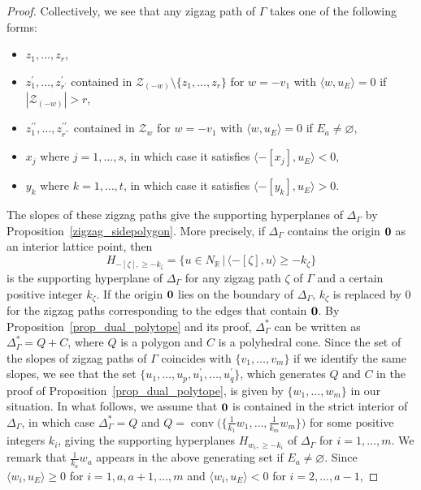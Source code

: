 \documentclass[pdftex]{sigma}%
\numberwithin{equation}{section}
\numberwithin{figure}{section}
\numberwithin{table}{section}
\newcommand{\RR}{\mathbb{R}}
\newcommand{\calZ}{\mathcal{Z}}
\begin{document}
\begin{proof}
Collectively, we see that any zigzag path of $\Gamma$ takes one of the following forms:
\begin{itemize}\itemsep=0pt
\item $z_1,\dots,z_r$,
\item $z_1^\prime,\dots,z_{r^\prime}^\prime$ contained in $\calZ_{(-w)}{\setminus}\{z_1,\dots,z_r\}$ for $w=-v_1$ with $\langle w,u_E\rangle=0$ if $|\calZ_{(-w)}|>r$,
\item $z_1^{\prime\prime},\dots,z_{r^{\prime\prime}}^{\prime\prime}$ contained in $\calZ_w$ for $w=-v_1$ with $\langle w,u_E\rangle=0$ if $E_a\neq\varnothing$,
\item $x_j$ where $j=1,\dots,s$, in which case it satisfies $\langle-[x_j],u_E\rangle<0$,
\item $y_k$ where $k=1,\dots,t$, in which case it satisfies $\langle-[y_k],u_E\rangle>0$.
\end{itemize}
The slopes of these zigzag paths give the supporting hyperplanes of $\Delta_\Gamma$ by Proposition~\ref{zigzag_sidepolygon}. More precisely, if $\Delta_\Gamma$ contains the origin ${\bf 0}$ as an interior lattice point, then
\begin{displaymath}
H_{-[\zeta],\ge -k_\zeta}=\{u\in N_\RR\,|\,\langle-[\zeta],u\rangle\ge -k_\zeta\}
\end{displaymath}
is the supporting hyperplane of $\Delta_\Gamma$ for any zigzag path $\zeta$ of $\Gamma$ and a certain positive integer $k_\zeta$.
If the origin ${\bf 0}$ lies on the boundary of $\Delta_\Gamma$, $k_\zeta$ is replaced by $0$ for the zigzag paths corresponding to the edges that contain ${\bf 0}$.
By Proposition~\ref{prop_dual_polytope} and its proof, $\Delta_\Gamma^*$ can be written as $\Delta_\Gamma^*=Q+C$, where $Q$ is a polygon and $C$ is a polyhedral cone.
Since the set of the slopes of zigzag paths of $\Gamma$ coincides with $\{v_1,\dots,v_m\}$ if we identify the same slopes,
we see that the set $\{u_1,\dots,u_p,u_1^\prime,\dots,u_q^\prime\}$, which generates $Q$ and $C$ in the proof of Proposition~\ref{prop_dual_polytope},
is given by $\{w_1,\dots,w_m\}$ in our situation.
In what follows, we assume that ${\bf 0}$ is contained in the strict interior of $\Delta_\Gamma$, in which case $\Delta_\Gamma^*=Q$ and
$Q=\operatorname{conv}\big(\big\{\frac{1}{k_1}w_1,\dots,\frac{1}{k_m}w_m\big\}\big)$ for some positive integers $k_i$,
giving the supporting hyperplanes $H_{w_i,\ge-k_i}$ of $\Delta_\Gamma$ for $i=1,\dots,m$.
We remark that $\frac{1}{k_a}w_a$ appears in the above generating set if $E_a\neq\varnothing$.
Since $\langle w_i,u_E\rangle\ge0$ for $i=1,a, a+1,\dots, m$ and $\langle w_i,u_E\rangle<0$ for $i=2,\dots, a-1$,

\end{proof}
\end{document}
